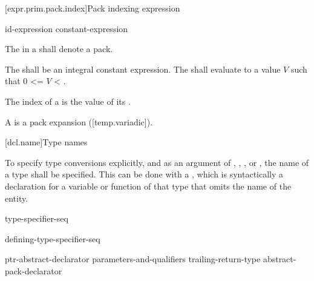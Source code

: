 \documentclass{wg21}
\begin{document}
\begin{addedblock}

[expr.prim.pack.index]{Pack indexing expression}

\begin{bnf}
    \br
    id-expression  \terminal{[} constant-expression \terminal{]}  \br
\end{bnf}

The  in a  shall denote a pack.

The  shall be an integral constant expression.
The  shall evaluate to a value $V$ such that 0 <= $V$ < .

The index of a  is the value of its .

A  is a pack expansion ([temp.variadic]).


\end{addedblock}

[dcl.name]{Type names}

\pnum
{}%
To specify type conversions explicitly,
%
and as an argument of
,
,
,
or
,
the name of a type shall be specified.
This can be done with a
,
which is syntactically a declaration for a variable or function
of that type that omits the name of the entity.

\begin{bnf}
    \br
    type-specifier-seq 
\end{bnf}

\begin{bnf}
    \br
    defining-type-specifier-seq 
\end{bnf}

\begin{bnf}
    \br
    ptr-abstract-declarator\br
     parameters-and-qualifiers trailing-return-type\br
    abstract-pack-declarator
\end{bnf}
\end{document}
